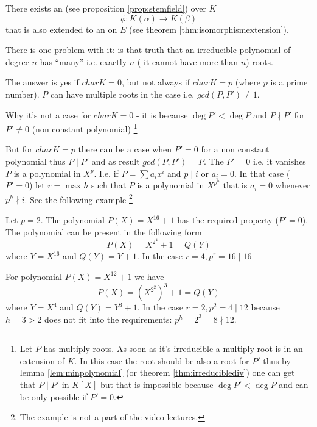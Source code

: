 There exists an  (see proposition
\ref{prop:stemfield}) over $K$
\[
\phi: K\left(\alpha\right) \to K\left(\beta\right)
\]
that is also extended to an  on $E$
(see theorem \ref{thm:isomorphismextension}).

There is one problem with it: is that truth that an irreducible
polynomial of degree $n$ has ``many'' i.e. exactly $n$ ( it cannot
have more than $n$) roots.

The answer is yes if $char K = 0$, but not always if $char K = p$
(where $p$ is a prime number). $P$ can have multiple roots in the case
i.e. $gcd(P, P') \ne 1$.

Why it's not a case for $char K = 0$ - it is because
$\deg P' < \deg P$ and $P \nmid P'$ for $P' \ne 0$ (non constant
polynomial)
\footnote{
  Let $P$ has multiply roots. As soon as it's irreducible a multiply
  root is in an extension of $K$. In this case the root should be also
  a root for $P'$ thus by lemma \ref{lem:minpolynomial} (or
  theorem \ref{thm:irreduciblediv}) one can get
  that $P \mid P'$ in $K\left[X\right]$ but that is impossible because
  $\deg P' < \deg P$ and can be only possible if $P' = 0$.
}

But for $char K = p$ there can be a case when $P' = 0$ for a non
constant polynomial thus $P \mid P'$ and as result $gcd(P, P') = P$.
The $P' = 0$ i.e. it vanishes $P$ is a polynomial in $X^p$. I.e. if
$P = \sum a_i x^i$ and $p \mid i$ or $a_i = 0$. In that case ($P' =
0$) let $r = \max h$ such that $P$ is a polynomial in $X^{p^h}$ that
is $a_i = 0$ whenever $p^h \nmid i$. See the following example
\footnote{
  The example is not a part of the video lectures.
}
\begin{example}
  Let $p = 2$. The polynomial $P\left(X\right) = X^{16} + 1$ has the
  required property ($P' = 0$). The polynomial can be present in the
  following form
  \[
  P\left(X\right) = X^{2^4} + 1 = Q(Y)
  \]
  where $Y = X^{16}$ and $Q(Y) = Y + 1$. In the case
  $r=4, p^r = 16 \mid 16$

  For polynomial $P\left(X\right) = X^{12} + 1$ we have
  \[
  P\left(X\right) = \left(X^{2^2}\right)^3 + 1 = Q(Y)
  \]
  where $Y = X^4$ and $Q(Y) = Y^3 + 1$. In the case
  $r=2, p^2 = 4 \mid 12$ because $h = 3 > 2$ does not fit into
  the requirements: $p^h = 2^3 = 8 \nmid 12$.
\end{example}

